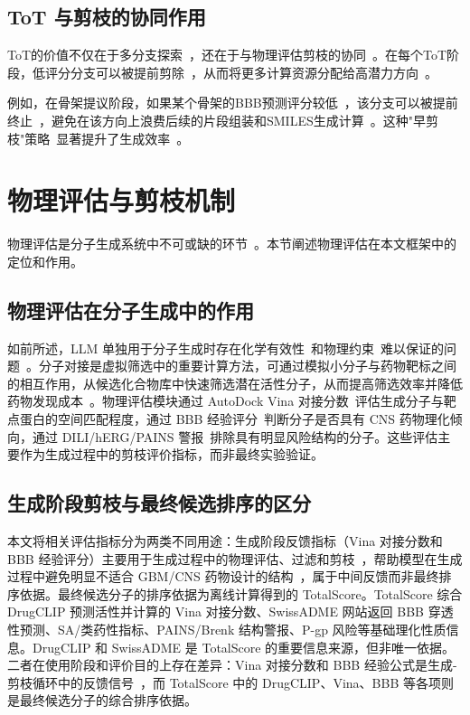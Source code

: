 \subsection{ToT 与剪枝的协同作用}

ToT的价值不仅在于多分支探索~\cite{Yao2023}，还在于与物理评估剪枝的协同~\cite{Yao2023}。在每个ToT阶段，低评分分支可以被提前剪除~\cite{Yao2023}，从而将更多计算资源分配给高潜力方向~\cite{Yao2023}。

例如，在骨架提议阶段，如果某个骨架的BBB预测评分较低~\cite{Clark2000}，该分支可以被提前终止~\cite{Yao2023}，避免在该方向上浪费后续的片段组装和SMILES生成计算~\cite{Yao2023}。这种"早剪枝"策略~\cite{Yao2023}显著提升了生成效率~\cite{Yao2023}。

\section{物理评估与剪枝机制}\label{sec:physics-pruning}

物理评估是分子生成系统中不可或缺的环节~\cite{Trott2010,Clark2000,Aronov2008}。本节阐述物理评估在本文框架中的定位和作用。

\subsection{物理评估在分子生成中的作用}

如前所述，LLM 单独用于分子生成时存在化学有效性~\cite{Bagal2021}和物理约束~\cite{Pardridge2012}难以保证的问题~\cite{jin2025effective,Li2025DrugPilot}。分子对接是虚拟筛选中的重要计算方法，可通过模拟小分子与药物靶标之间的相互作用，从候选化合物库中快速筛选潜在活性分子，从而提高筛选效率并降低药物发现成本~\cite{张煜卓2017}。物理评估模块通过 AutoDock Vina 对接分数~\cite{Trott2010}评估生成分子与靶点蛋白的空间匹配程度，通过 BBB 经验评分~\cite{Clark2000,Ertl2000}判断分子是否具有 CNS 药物理化倾向，通过 DILI/hERG/PAINS 警报~\cite{Aronov2008}排除具有明显风险结构的分子。这些评估主要作为生成过程中的剪枝评价指标，而非最终实验验证。

\subsection{生成阶段剪枝与最终候选排序的区分}

本文将相关评估指标分为两类不同用途：生成阶段反馈指标（Vina 对接分数和 BBB 经验评分）主要用于生成过程中的物理评估、过滤和剪枝~\cite{Trott2010,Clark2000}，帮助模型在生成过程中避免明显不适合 GBM/CNS 药物设计的结构~\cite{Trott2010,Clark2000}，属于中间反馈而非最终排序依据。最终候选分子的排序依据为离线计算得到的 TotalScore。TotalScore 综合 DrugCLIP 预测活性并计算的 Vina 对接分数、SwissADME 网站返回 BBB 穿透性预测、SA/类药性指标、PAINS/Brenk 结构警报、P-gp 风险等基础理化性质信息。DrugCLIP 和 SwissADME 是 TotalScore 的重要信息来源，但非唯一依据。二者在使用阶段和评价目的上存在差异：Vina 对接分数和 BBB 经验公式是生成-剪枝循环中的反馈信号~\cite{Trott2010,Clark2000}，而 TotalScore 中的 DrugCLIP、Vina、BBB 等各项则是最终候选分子的综合排序依据。

